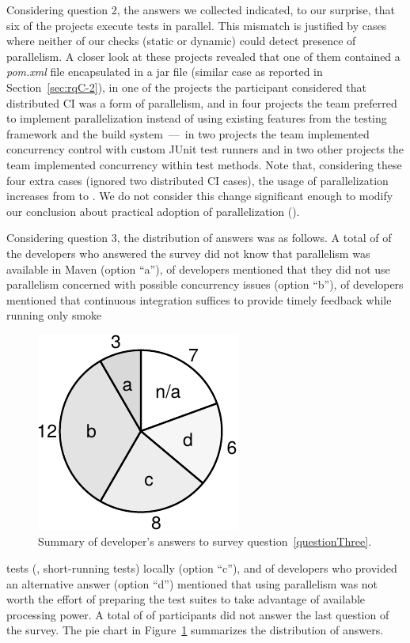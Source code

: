Considering question 2, the answers we collected indicated, to our
surprise, that six of the \emailsProjectsAnswered{} projects execute
tests in parallel.  This mismatch is justified by cases where neither
of our checks (static or dynamic) could detect presence of
parallelism.  A closer look at these projects revealed that one of
them contained a \emph{pom.xml} file encapsulated in a jar file
(similar case as reported in Section~\ref{sec:rqC-2}), in one of the
projects the participant considered that distributed CI was a form of
parallelism, and in four projects the team preferred to implement
parallelization instead of using existing features from the testing
framework and the build system~---~in two projects the team
implemented concurrency control with custom JUnit test runners and in
two other projects the team implemented concurrency within test
methods.  Note that, considering these four extra cases (ignored two
distributed CI cases), the usage of parallelization increases from
\percentParallel{} to \percentParallelUpdated{}.  We do not consider
this change significant enough to modify our conclusion about
practical adoption of parallelization (\numRQAdoptionOne{}).

Considering question 3, the distribution of answers was as follows.  A
total of \emailsA{} of the \emailsProjectsAnswered{} developers who
answered the survey did not know that parallelism was available in
Maven (option ``a''), \emailsB{} of developers mentioned that they did
not use parallelism concerned with possible concurrency issues (option
``b''), \emailsD{} of developers mentioned that continuous integration
suffices to provide timely feedback while running only smoke
\begin{figure}
    \centering
    \includegraphics[width=.15\textwidth]{results/survey.pdf}
    \caption{\label{fig:rq5-answers}Summary of developer's answers to
      survey question~\ref{questionThree}.}
\end{figure}
tests (\ie{}, short-running tests) locally (option ``c''), and \emailsD{} of
developers who provided an alternative answer (option ``d'') mentioned
that using parallelism was not worth the effort of preparing the test
suites to take advantage of available processing power.  A total of
\emailsNA{} of participants did not answer the last question of the
survey.  The pie chart in Figure~\ref{fig:rq5-answers} 
summarizes the distribution of answers.

